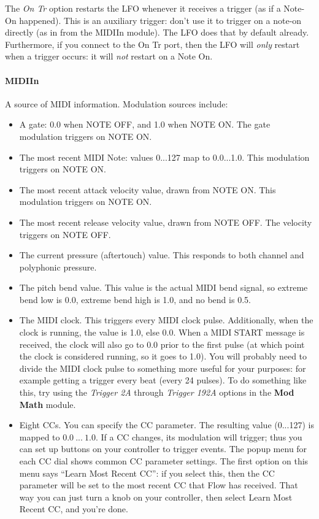 \documentclass{article}
\begin{document}
The {\it On Tr} option restarts the LFO whenever it receives a trigger (as if a Note-On happened).  This is an auxiliary trigger: don't use it to trigger on a note-on directly (as in from the MIDIIn module).  The LFO does that by default already.  Furthermore, if you connect to the On Tr port, then the LFO will {\it only} restart when a trigger occurs: it will {\it not} restart on a Note On.

\paragraph{MIDIIn}  A source of MIDI information.  Modulation sources include:

\begin{itemize}
\item A gate: 0.0 when NOTE OFF, and 1.0 when NOTE ON.  The gate modulation triggers on NOTE ON.
\item The most recent MIDI Note: values 0...127 map to 0.0...1.0.  This modulation triggers on NOTE ON.
\item The most recent attack velocity value, drawn from NOTE ON. This modulation triggers on NOTE ON.
\item The most recent release velocity value, drawn from NOTE OFF.  The velocity triggers on NOTE OFF.
\item The current pressure (aftertouch) value.  This responds to both channel and polyphonic pressure.
\item The pitch bend value.  This value is the actual MIDI bend signal, so extreme bend low is 0.0, extreme bend high is 1.0, and no bend is 0.5.
\item The MIDI clock.  This triggers every MIDI clock pulse.  Additionally, when the clock is running, the value is 1.0, else 0.0.  When a MIDI START message is received, the clock will also go to 0.0 prior to the first pulse (at which point the clock is considered running, so it goes to 1.0).  You will probably need to divide the MIDI clock pulse to something more useful for your purposes: for example getting a trigger every beat (every 24 pulses).  To do something like this, try using the {\it Trigger 2A} through {\it Trigger 192A} options in the {\bf Mod Math} module.
\item Eight CCs.  You can specify the CC parameter.  The resulting value (0...127) is mapped to \(0.0\ ...\ 1.0\).  If a CC changes, its modulation will trigger; thus you can set up buttons on your controller to trigger events. The popup menu for each CC dial shows common CC parameter settings.  The first option on this menu says ``Learn Most Recent CC'': if you select this, then the CC parameter will be set to the most recent CC that Flow has received.  That way you can just turn a knob on your controller, then select Learn Most Recent CC, and you're done.  


\end{itemize}
\end{document}
